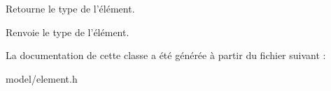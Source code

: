 Retourne le type de l'élément. 

\begin{DoxyReturn}{Renvoie}
le type de l'élément. 
\end{DoxyReturn}


La documentation de cette classe a été générée à partir du fichier suivant \+:\begin{DoxyCompactItemize}
\item 
model/element.\+h\end{DoxyCompactItemize}
